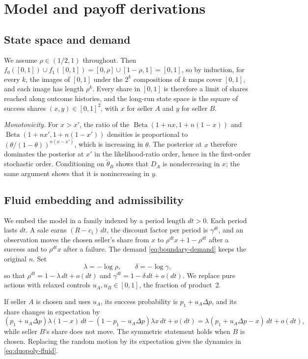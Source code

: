 \documentclass[11pt]{article}
\DeclareMathOperator{\Beta}{Beta}
\theoremstyle{definition}
\begin{document}
\clearpage
\appendix

\section{Model and payoff derivations}\label{app:model}

\subsection{State space and demand}

We assume $\rho\in(1/2,1)$ throughout. Then $f_0([0,1])\cup f_1([0,1])
=[0,\rho]\cup[1-\rho,1]=[0,1]$, so by induction, for every $k$, the images
of $[0,1]$ under the $2^k$ compositions of $k$ maps cover $[0,1]$, and each
image has length $\rho^k$. Every share in $[0,1]$ is therefore a limit of
shares reached along outcome histories, and the long-run state space is the
square of success shares $(x,y)\in[0,1]^2$, with $x$ for seller $A$ and $y$
for seller $B$.

\emph{Monotonicity.} For $x>x'$, the ratio of the $\Beta(1+nx,1+n(1-x))$
and $\Beta(1+nx',1+n(1-x'))$ densities is proportional to
$(\theta/(1-\theta))^{n(x-x')}$, which is increasing in $\theta$. The
posterior at $x$ therefore dominates the posterior at $x'$ in the
likelihood-ratio order, hence in the first-order stochastic order.
Conditioning on $\widetilde\theta_B$ shows that $D_A$ is nondecreasing in
$x$; the same argument shows that it is nonincreasing in $y$.

\subsection{Fluid embedding and admissibility}\label{app:fluid}

We embed the model in a family indexed by a period length $dt>0$. Each
period lasts $dt$. A sale earns $(R-c_i)\,dt$, the discount factor per
period is $\gamma^{dt}$, and an observation moves the chosen seller's share
from $x$ to $\rho^{dt}x+1-\rho^{dt}$ after a success and to $\rho^{dt}x$
after a failure. The demand \eqref{eq:boundary-demand} keeps the original
$n$. Set
\begin{equation*}
\lambda=-\log\rho,\qquad\delta=-\log\gamma,
\end{equation*}
so that $\rho^{dt}=1-\lambda\,dt+o(dt)$ and $\gamma^{dt}=1-\delta\,dt+o(dt)$.
We replace pure actions with relaxed controls $u_A,u_B\in[0,1]$, the
fraction of product~2.

If seller $A$ is chosen and uses $u_A$, its success probability is
$p_1+u_A\Delta p$, and its share changes in expectation by
\begin{equation*}
(p_1+u_A\Delta p)\lambda(1-x)\,dt-(1-p_1-u_A\Delta p)\lambda x\,dt+o(dt)
=\lambda(p_1+u_A\Delta p-x)\,dt+o(dt),
\end{equation*}
while seller $B$'s share does not move. The symmetric statement holds when
$B$ is chosen. Replacing the random motion by its expectation gives the
dynamics in \eqref{eq:duopoly-fluid}.
\end{document}
